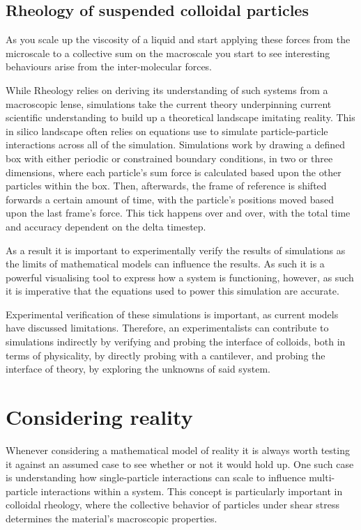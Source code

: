 \subsection{Rheology of suspended colloidal particles}

As you scale up the viscosity of a liquid and start applying these forces from the microscale to a collective sum on the macroscale you start to see interesting behaviours arise from the inter-molecular forces.

While Rheology relies on deriving its understanding of such systems from a macroscopic lense, simulations take the current theory underpinning current scientific understanding to build up a theoretical landscape imitating reality. This in silico landscape often relies on equations use to simulate particle-particle interactions across all of the simulation. Simulations work by drawing a defined box with either periodic or constrained boundary conditions, in two or three dimensions, where each particle's sum force is calculated based upon the other particles within the box. Then, afterwards, the frame of reference is shifted forwards a certain amount of time, with the particle's positions moved based upon the last frame's force. This tick happens over and over, with the total time and accuracy dependent on the delta timestep.\cite{foss_brady_2000}
 
As a result it is important to experimentally verify the results of simulations as the limits of mathematical models can influence the results. As such it is a powerful visualising tool to express how a system is functioning, however, as such it is imperative that the equations used to power this simulation are accurate. 

Experimental verification of these simulations is important, as current models have discussed limitations. Therefore, an experimentalists can contribute to simulations indirectly by verifying and probing the interface of colloids, both in terms of physicality, by directly probing with a cantilever, and probing the interface of theory, by exploring the unknowns of said system. \cite{SmartMats, Rheo2}


\section{Considering reality}

Whenever considering a mathematical model of reality it is always worth testing it against an assumed case to see whether or not it would hold up. One such case is understanding how single-particle interactions can scale to influence multi-particle interactions within a system. This concept is particularly important in colloidal rheology, where the collective behavior of particles under shear stress determines the material’s macroscopic properties.

